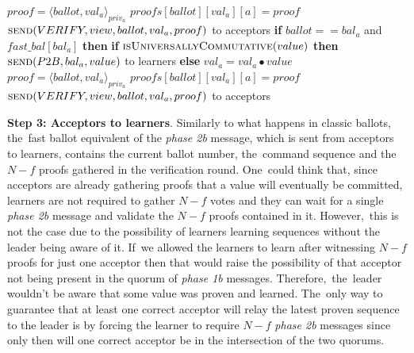 \documentclass[algorithms,article,accept,moreauthors,pdftex,10pt,a4paper]{Definitions/mdpi}
\begin{document}
\begin{algorithm}[H]
\begin{algorithmic}[1]
\State \hspace{\algorithmicindent}\hspace{\algorithmicindent} $proof = \langle ballot, val_a \rangle_{priv_a}$
\State \hspace{\algorithmicindent}\hspace{\algorithmicindent} $proofs[ballot][val_a][a] = proof$
\State \hspace{\algorithmicindent}\hspace{\algorithmicindent} $\Call{send}{VERIFY, view, ballot, val_a, proof}$ to acceptors
\EndFunction
\State
{}
\State \textbf{if} $ballot == bal_a$ and $fast\_bal[bal_a]$ \textbf{then}
\State \hspace{\algorithmicindent} \textbf{if} $\Call{isUniversallyCommutative}{value}$ \textbf{then}
\State \hspace{\algorithmicindent}\hspace{\algorithmicindent} $\Call{send}{P2B,bal_a, value}$ to learners
\State \hspace{\algorithmicindent} \textbf{else}
\State \hspace{\algorithmicindent}\hspace{\algorithmicindent} $val_a = val_a \bullet value$
\State \hspace{\algorithmicindent}\hspace{\algorithmicindent} $proof = \langle ballot, val_a \rangle_{priv_a}$
\State \hspace{\algorithmicindent}\hspace{\algorithmicindent} $proofs[ballot][val_a][a] = proof$
\State \hspace{\algorithmicindent}\hspace{\algorithmicindent} $\Call{send}{VERIFY, view, ballot, val_a, proof}$ to acceptors
\EndFunction
\end{algorithmic}
\end{algorithm}


{\bf Step 3: Acceptors to learners}. Similarly to what happens in classic ballots, the~fast ballot equivalent of the \textit{phase 2b} message, which is sent from acceptors to learners, contains the current ballot number, the~command sequence and the $N-f$ proofs gathered in the verification round. One~could think that, since acceptors are already gathering proofs that a value will eventually be committed, learners are not required to gather $N-f$ votes and they can wait for a single \textit{phase 2b} message and validate the $N-f$ proofs contained in it. However,~this is not the case due to the possibility of learners learning sequences without the leader being aware of it. If~we allowed the learners to learn after witnessing $N-f$ proofs for just one acceptor then that would raise the possibility of that acceptor not being present in the quorum of \textit{phase 1b} messages. Therefore,~the~leader wouldn't be aware that some value was proven and learned. The~only way to guarantee that at least one correct acceptor will relay the latest proven sequence to the leader is by forcing the learner to require $N-f$ \textit{phase 2b} messages since only then will one correct acceptor be in the intersection of the two quorums. 
\end{document}

